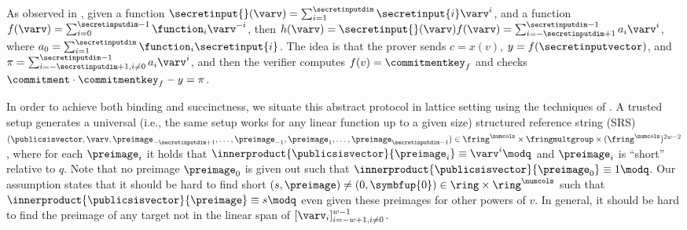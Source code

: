As observed in \cite{ac20}, given a function $\secretinput{}(\varv) = \sum_{i = 1}^{\secretinputdim} \secretinput{i} \varv^i$, and a function $f(\varv) = \sum_{i = 0}^{\secretinputdim - 1} \function_i \varv^{-i}$, then $h(\varv) = \secretinput{}(\varv) f(\varv) = \sum_{i = {-}\secretinputdim + 1}^{\secretinputdim - 1} a_i \varv^i$, where $a_0 = \sum_{i = 1}^{\secretinputdim} \function_i\secretinput{i}$. The idea is that the prover sends $c = x(v)$, $y = f(\secretinputvector)$, and $\pi = \sum_{i={-}\secretinputdim +1, i\neq 0}^{\secretinputdim - 1} a_i \varv^i$, and then the verifier computes $f(v) = \commitmentkey_f$ and checks $\commitment \cdot \commitmentkey_f - y = \pi$.

In order to achieve both binding and succinctness, we situate this abstract protocol in lattice setting using the techniques of \cite{C:ACLMT22}. A trusted setup generates a universal (i.e., the same setup works for any linear function up to a given size) structured reference string (SRS) $(\publicsisvector, \varv, \preimage_{-\secretinputdim + 1}, \dots, \preimage_{-1}, \preimage_{1}, \dots, \preimage_{\secretinputdim - 1}) \in \fring^\numcols \times \fringmultgroup \times (\fring^\numcols)^{2w-2}$, where for each $\preimage_i$ it holds that $\innerproduct{\publicsisvector}{\preimage_i} \equiv \varv^i \modq$ and $\preimage_i$ is ``short'' relative to $q$. Note that no preimage $\preimage_0$ is given out such that $\innerproduct{\publicsisvector}{\preimage_0} \equiv 1 \modq$. Our \krisis assumption states that it should be hard to find short $(s,\preimage) \neq (0,\symbfup{0}) \in \ring \times \ring^{\numcols}$ such that $\innerproduct{\publicsisvector}{\preimage} \equiv s \modq$ even given these preimages for other powers of $v$. In general, it should be hard to find the preimage of any target not in the linear span of $[\varv_i]_{i={-w}+1,i\neq 0}^{w-1}$.


